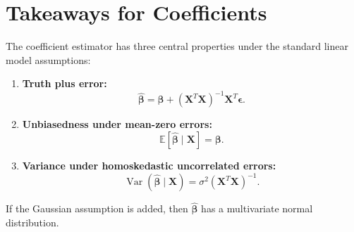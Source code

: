 \section{Takeaways for Coefficients}

The coefficient estimator has three central properties under the standard linear model assumptions:
\begin{enumerate}
  \item \textbf{Truth plus error:}
  \begin{equation}
    \widehat{\boldsymbol{\beta}}
    =\boldsymbol{\beta}
    +(\mathbf{X}^T\mathbf{X})^{-1}\mathbf{X}^T\boldsymbol{\epsilon}.
  \end{equation}
  \item \textbf{Unbiasedness under mean-zero errors:}
  \begin{equation}
    \mathbb{E}[\widehat{\boldsymbol{\beta}}\mid\mathbf{X}]=\boldsymbol{\beta}.
  \end{equation}
  \item \textbf{Variance under homoskedastic uncorrelated errors:}
  \begin{equation}
    \operatorname{Var}(\widehat{\boldsymbol{\beta}}\mid\mathbf{X})
    =\sigma^2(\mathbf{X}^T\mathbf{X})^{-1}.
  \end{equation}
\end{enumerate}
If the Gaussian assumption is added, then \(\widehat{\boldsymbol{\beta}}\) has a multivariate normal distribution.

